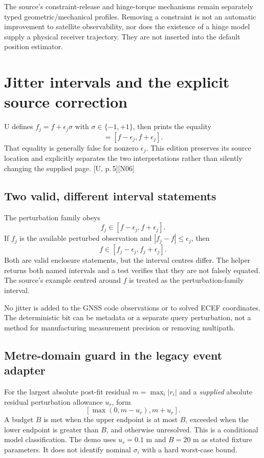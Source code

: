 \documentclass[11pt,a4paper]{article}
\newcommand{\src}[1]{\textcolor{muted}{[U, #1]}}
\newcommand{\dec}[1]{\textcolor{accent}{[N#1]}}
\begin{document}
The source's constraint-release and hinge-torque mechanisms remain separately typed
geometric/mechanical profiles. Removing a constraint is not an automatic improvement
to satellite observability, nor does the existence of a hinge model supply a physical
receiver trajectory. They are not inserted into the default position estimator.
\clearpage

\section{Jitter intervals and the explicit source correction}
U defines $f_j=f+\epsilon_j\sigma$ with $\sigma\in\{-1,+1\}$, then prints the equality
\begin{equation}
[f_j-\epsilon_j,f_j+\epsilon_j]=[f-\epsilon_j,f+\epsilon_j].
\end{equation}
That equality is generally false for nonzero $\epsilon_j$. This edition preserves
its source location and explicitly separates the two interpretations rather than
silently changing the supplied page. \src{p.\,5}\dec{06}

\subsection{Two valid, different interval statements}
The perturbation family obeys
\begin{equation}
f_j\in[f-\epsilon_j,f+\epsilon_j].
\end{equation}
If $f_j$ is the available perturbed observation and $|f_j-f|\le\epsilon_j$, then
\begin{equation}
f\in[f_j-\epsilon_j,f_j+\epsilon_j].
\end{equation}
Both are valid enclosure statements, but the interval centres differ. The helper
returns both named intervals and a test verifies that they are not falsely equated.
The source's example centred around $f$ is treated as the perturbation-family interval.

No jitter is added to the GNSS code observations or to solved ECEF coordinates.
The deterministic bit can be metadata or a separate query perturbation, not a method
for manufacturing measurement precision or removing multipath.

\subsection{Metre-domain guard in the legacy event adapter}
For the largest absolute post-fit residual $m=\max_i|r_i|$ and a \emph{supplied}
absolute residual perturbation allowance $u_r$, form
\begin{equation}
\left[\max(0,m-u_r),m+u_r\right].
\end{equation}
A budget $B$ is met when the upper endpoint is at most $B$, exceeded when the lower
endpoint is greater than $B$, and otherwise unresolved. This is a conditional model
classification. The demo uses $u_r=0.1$ m and $B=20$ m as stated fixture parameters.
It does not identify nominal $\sigma_i$ with a hard worst-case bound.
\clearpage
\end{document}
